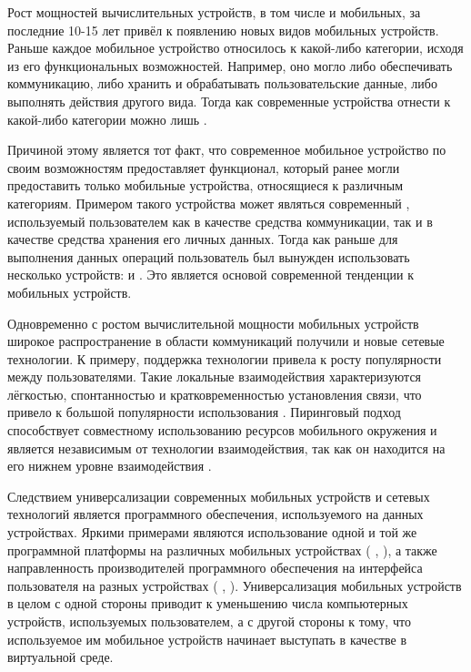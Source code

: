 %
Рост мощностей вычислительных устройств, в том числе и мобильных, за последние 10-15 лет привёл к появлению новых видов мобильных устройств.
%
Раньше каждое мобильное устройство относилось к какой-либо категории, исходя из его функциональных возможностей. 
%
Например, оно могло либо обеспечивать коммуникацию, либо хранить и обрабатывать пользовательские данные, либо выполнять действия другого вида.
%
Тогда как современные устройства отнести к какой-либо категории можно лишь .

%
Причиной этому является тот факт, что современное мобильное устройство по своим возможностям предоставляет функционал, который ранее могли предоставить только мобильные устройства, относящиеся к различным категориям.
%
Примером такого устройства может являться современный , используемый пользователем как в качестве средства коммуникации, так и в качестве средства хранения его личных данных.
%
Тогда как раньше для выполнения данных операций пользователь был вынужден использовать несколько устройств:  и . 
%
Это является основой современной тенденции к  мобильных устройств.

%
Одновременно с ростом вычислительной мощности мобильных устройств широкое распространение в области коммуникаций получили и новые сетевые технологии.
%
К примеру, поддержка технологии   привела к росту популярности  между пользователями.
%
Такие локальные взаимодействия характеризуются лёгкостью, спонтанностью и кратковременностью установления связи, что привело к большой популярности использования  .
%
Пиринговый подход способствует совместному использованию ресурсов мобильного окружения и является независимым от технологии взаимодействия, так как он находится на его нижнем уровне взаимодействия  .

%
Следствием универсализации современных мобильных устройств и сетевых технологий является  программного обеспечения, используемого на данных устройствах.
%
Яркими примерами являются использование одной и той же программной платформы на различных мобильных устройствах ( ,  ), а также направленность производителей программного обеспечения на  интерфейса пользователя на разных устройствах ( ,  ).
%
Универсализация мобильных устройств в целом с одной стороны приводит к уменьшению числа компьютерных устройств, используемых пользователем, а с другой стороны к тому, что используемое им мобильное устройств начинает выступать в качестве  в виртуальной среде.


